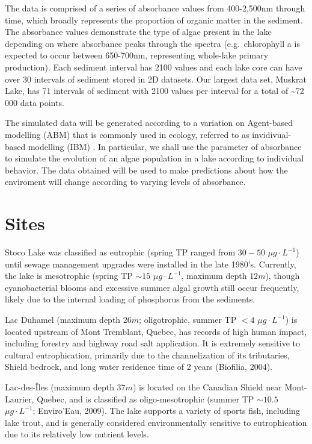 \documentclass[]{article}
\begin{document}
The data is comprised of a series of absorbance values from 400-2,500nm
through time, which broadly represents the proportion of organic matter
in the sediment. The absorbance values demonstrate the type of algae
present in the lake depending on where absorbance peaks through the
spectra (e.g.~chlorophyll a is expected to occur between 650-700nm,
representing whole-lake primary production). Each sediment interval has
2100 values and each lake core can have over 30 intervals of sediment
stored in 2D datasets. Our largest data set, Muskrat Lake, has 71
intervals of sediment with 2100 values per interval for a total of
\textasciitilde{}72 000 data points.

The simulated data will be generated according to a variation on
Agent-based modelling (ABM) that is commonly used in ecology, referred
to as invidivual-based modelling (IBM) . In particular, we shall use the
parameter of absorbance to simulate the evolution of an algae population
in a lake according to individual behavior. The data obtained will be
used to make predictions about how the enviroment will change according
to varying levels of absorbance.

\section{Sites}\label{sites}

Stoco Lake was classified as eutrophic (spring TP ranged from \(30-50\)
\(\mu g\cdot L^{-1}\)) until sewage management upgrades were installed
in the late 1980's. Currently, the lake is mesotrophic (spring TP
\(\sim 15\) \(\mu g\cdot L^{-1}\), maximum depth \(12m\)), though
cyanobacterial blooms and excessive summer algal growth still occur
frequently, likely due to the internal loading of phosphorus from the
sediments.

Lac Duhamel (maximum depth \(26m\); oligotrophic, summer TP \(<4\)
\(\mu g\cdot L^{-1}\)) is located upstream of Mont Tremblant, Quebec,
has records of high human impact, including forestry and highway road
salt application. It is extremely sensitive to cultural eutrophication,
primarily due to the channelization of its tributaries, Shield bedrock,
and long water residence time of 2 years (Biofilia, 2004).

Lac-des-Îles (maximum depth \(37m\)) is located on the Canadian Shield
near Mont-Laurier, Quebec, and is classified as oligo-mesotrophic
(summer TP \(\sim 10.5\) \(\mu g\cdot L^{-1}\); Enviro'Eau, 2009). The
lake supports a variety of sports fish, including lake trout, and is
generally considered environmentally sensitive to eutrophication due to
its relatively low nutrient levels.
\end{document}
